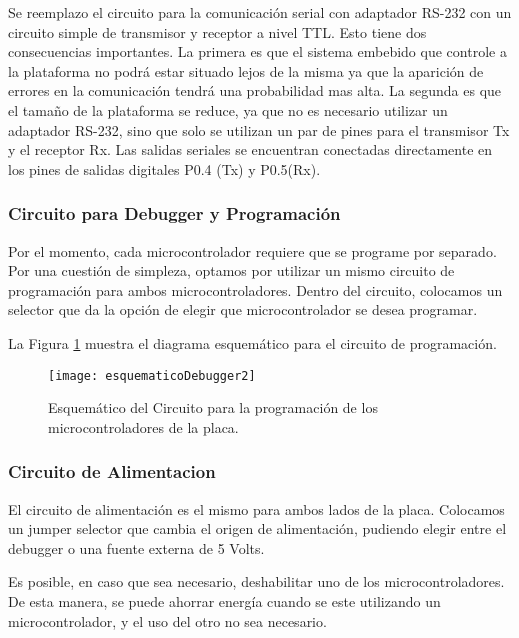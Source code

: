 Se reemplazo el circuito para la comunicación serial con adaptador RS-232 con un circuito simple de transmisor y receptor a nivel TTL. Esto tiene dos consecuencias importantes. La primera es que el sistema embebido que controle a la plataforma no podrá estar situado lejos de la misma ya que la aparición de errores en la comunicación tendrá una probabilidad mas alta. La segunda es que el tamaño de la plataforma se reduce, ya que no es necesario utilizar un adaptador RS-232, sino que solo se utilizan un par de pines para el transmisor Tx y el receptor Rx. Las salidas seriales se encuentran conectadas directamente en los pines de salidas digitales P0.4 (Tx) y P0.5(Rx).


\subsubsection{Circuito para Debugger y Programación} %
\label{it5:subs:debugger_programacion2}

Por el momento, cada microcontrolador requiere que se programe por separado. Por una cuestión de simpleza, optamos por utilizar un mismo circuito de programación para ambos microcontroladores. Dentro del circuito, colocamos un selector que da la opción de elegir que microcontrolador se desea programar.

La Figura \ref{fig:esquematicoDebugger2} muestra el diagrama esquemático para el circuito de programación.

\begin{figure}  [H]
\centering
  \texttt{[image: esquematicoDebugger2]}
  \caption{Esquemático del Circuito para la programación de los microcontroladores de la placa.}\label{fig:esquematicoDebugger2}
\end{figure}



\subsubsection{Circuito de Alimentacion}
\label{subscircuito_de_alimentacion}

El circuito de alimentación es el mismo para ambos lados de la placa. Colocamos un jumper selector que cambia el origen de alimentación, pudiendo elegir entre el debugger o una fuente externa de 5 Volts.

Es posible, en caso que sea necesario, deshabilitar uno de los microcontroladores. De esta manera, se puede ahorrar energía cuando se este utilizando un microcontrolador, y el uso del otro no sea necesario. 

